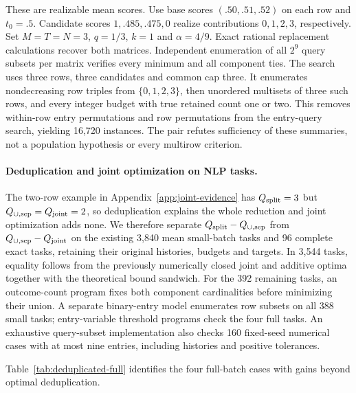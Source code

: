These are realizable mean scores. Use base scores $(.50,.51,.52)$ on each row and $t_0=.5$. Candidate scores $1,.485,.475,0$ realize contributions $0,1,2,3$, respectively. Set $M=T=N=3$, $q=1/3$, $k=1$ and $\alpha=4/9$. Exact rational replacement calculations recover both matrices. Independent enumeration of all $2^9$ query subsets per matrix verifies every minimum and all component ties. The search uses three rows, three candidates and common cap three. It enumerates nondecreasing row triples from $\{0,1,2,3\}$, then unordered multisets of three such rows, and every integer budget with true retained count one or two. This removes within-row entry permutations and row permutations from the entry-query search, yielding 16,720 instances. The pair refutes sufficiency of these summaries, not a population hypothesis or every multirow criterion.

\paragraph{Deduplication and joint optimization on NLP tasks.} The two-row example in Appendix~\ref{app:joint-evidence} has $Q_{\rm split}=3$ but $Q_{\cup,\rm sep}=Q_{\rm joint}=2$, so deduplication explains the whole reduction and joint optimization adds none. We therefore separate $Q_{\rm split}-Q_{\cup,\rm sep}$ from $Q_{\cup,\rm sep}-Q_{\rm joint}$ on the existing 3,840 mean small-batch tasks and 96 complete exact tasks, retaining their original histories, budgets and targets. In 3,544 tasks, equality follows from the previously numerically closed joint and additive optima together with the theoretical bound sandwich. For the 392 remaining tasks, an outcome-count program fixes both component cardinalities before minimizing their union. A separate binary-entry model enumerates row subsets on all 388 small tasks; entry-variable threshold programs check the four full tasks. An exhaustive query-subset implementation also checks 160 fixed-seed numerical cases with at most nine entries, including histories and positive tolerances.

Table~\ref{tab:deduplicated-full} identifies the four full-batch cases with gains beyond optimal deduplication.

